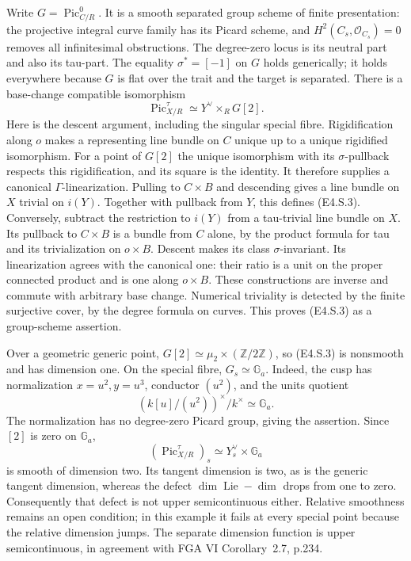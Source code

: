 Write $G=\operatorname{Pic}^0_{C/R}$. It is a smooth separated group
scheme of finite presentation: the projective integral curve family
has its Picard scheme, and $H^2(C_s,\mathcal O_{C_s})=0$ removes
all infinitesimal obstructions. The degree-zero locus is its neutral
part and also its tau-part. The equality $\sigma^*=[-1]$ on $G$
holds generically; it holds everywhere because $G$ is flat over
the trait and the target is separated.
There is a base-change compatible isomorphism
\[
 \operatorname{Pic}^\tau_{X/R}
       \simeq Y^\vee\times_R G[2].                  \tag{E4.S.3}
\]
Here is the descent argument, including the singular special fibre.
Rigidification along $o$ makes a representing line bundle on $C$
unique up to a unique rigidified isomorphism. For a point of $G[2]$
the unique isomorphism with its $\sigma$-pullback respects this
rigidification, and its square is the identity. It therefore supplies
a canonical $\Gamma$-linearization. Pulling to $C\times B$ and
descending gives a line bundle on $X$ trivial on $i(Y)$.
Together with pullback from $Y$, this defines (E4.S.3).
Conversely, subtract the restriction to $i(Y)$ from a tau-trivial
line bundle on $X$. Its pullback to $C\times B$ is a bundle from
$C$ alone, by the product formula for tau and its trivialization on
$o\times B$. Descent makes its class $\sigma$-invariant. Its
linearization agrees with the canonical one: their ratio is a unit
on the proper connected product and is one along $o\times B$.
These constructions are inverse and commute with arbitrary base
change. Numerical triviality is detected by the finite surjective
cover, by the degree formula on curves. This proves (E4.S.3) as a
group-scheme assertion.

Over a geometric generic point,
$G[2]\simeq\mu_2\times(\mathbb Z/2\mathbb Z)$, so (E4.S.3)
is nonsmooth and has dimension one. On the special fibre,
$G_s\simeq\mathbb G_a$. Indeed, the cusp has normalization
$x=u^2,y=u^3$, conductor $(u^2)$, and the units quotient
\[
 (k[u]/(u^2))^\times/k^\times\simeq\mathbb G_a.
\]
The normalization has no degree-zero Picard group, giving the
assertion. Since $[2]$ is zero on $\mathbb G_a$,
\[
 (\operatorname{Pic}^\tau_{X/R})_s
       \simeq Y_s^\vee\times\mathbb G_a
\]
is smooth of dimension two. Its tangent dimension is two, as is
the generic tangent dimension, whereas the defect
$\dim\operatorname{Lie}-\dim$ drops from one to zero.
Consequently that defect is not upper semicontinuous either.
Relative smoothness remains an open condition; in this example it
fails at every special point because the relative dimension jumps.
The separate dimension function is upper semicontinuous, in agreement
with FGA VI Corollary~2.7, p.234.

